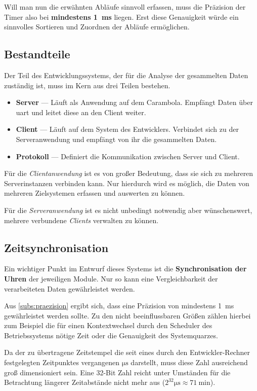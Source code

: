 Will man nun die erwähnten Abläufe sinnvoll erfassen, muss die Präzision der
Timer also bei \textbf{mindestens \SI{1}{\milli\second}} liegen. Erst diese
Genauigkeit würde ein sinnvolles Sortieren und Zuordnen der Abläufe ermöglichen.

\subsection{Bestandteile}\label{subs:best}
Der Teil des Entwicklungssystems, der für die Analyse der gesammelten Daten
zuständig ist, muss im Kern aus drei Teilen bestehen.
\begin{itemize}
  \item \textbf{Server} --- Läuft als Anwendung auf dem Carambola. Empfängt
  Daten über \gls{uart} und leitet diese an den Client weiter.
  \item \textbf{Client} --- Läuft auf dem System des Entwicklers. Verbindet sich
  zu der Serveranwendung und empfängt von ihr die gesammelten Daten.
  \item \textbf{Protokoll} --- Definiert die Kommunikation zwischen Server und
  Client.
\end{itemize}
Für die \emph{Clientanwendung} ist es von großer Bedeutung, dass sie sich zu
mehreren Serverinstanzen verbinden kann. Nur hierdurch wird es möglich, die
Daten von mehreren Zielsystemen erfassen und auswerten zu können.

Für die \emph{Serveranwendung} ist es nicht unbedingt notwendig aber
wünschenswert, mehrere verbundene \emph{Clients} verwalten zu können.
\subsection{Zeitsynchronisation}\label{subs:time}
Ein wichtiger Punkt im Entwurf dieses Systems ist die \textbf{Synchronisation
der Uhren} der jeweiligen Module. Nur so kann eine Vergleichbarkeit der
verarbeiteten Daten gewährleistet werden.

Aus \autoref{subs:praezision} ergibt sich, dass eine Präzision von mindestens
\SI{1}{\milli\second} gewährleistet werden sollte. Zu den nicht beeinflussbaren
Größen zählen hierbei zum Beispiel die für einen Kontextwechsel durch den
Scheduler des Betriebssystems nötige Zeit oder die Genauigkeit des
Systemquarzes.

Da der zu übertragene Zeitstempel die seit eines durch den Entwickler-Rechner
festgelegten Zeitpunktes vergangenen $\si{\micro\second}$ darstellt, muss diese
Zahl ausreichend groß dimensioniert sein. Eine 32-Bit Zahl reicht unter
Umständen für die Betrachtung längerer Zeitabstände nicht mehr aus
($2^{32}\si{\micro\second}\approx \SI{71}{\minute}$).

